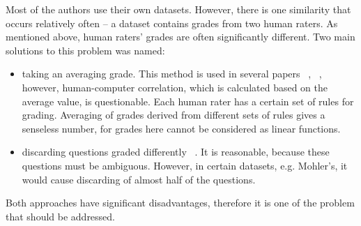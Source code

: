 Most of the authors use their own datasets. However, there is one similarity that occurs relatively often -- a dataset contains grades from two human raters. As mentioned above, human raters' grades are often significantly different. Two main solutions to this problem was named:

\begin{itemize}
\item taking an averaging grade. This method is used in several papers ~\cite{Mohler}, ~\cite{Sultan}, however, human-computer correlation, which is calculated based on the average value, is questionable. Each human rater has a certain set of rules for grading. Averaging of grades derived from different sets of rules gives a senseless number, for grades here cannot be considered as linear functions. 
\item discarding questions graded differently ~\cite{Zbontar}. It is reasonable, because these questions must be ambiguous. However, in certain datasets, e.g. Mohler's, it would cause discarding of almost half of the questions.
\end{itemize}

Both approaches have significant disadvantages, therefore it is one of the problem that should be addressed.